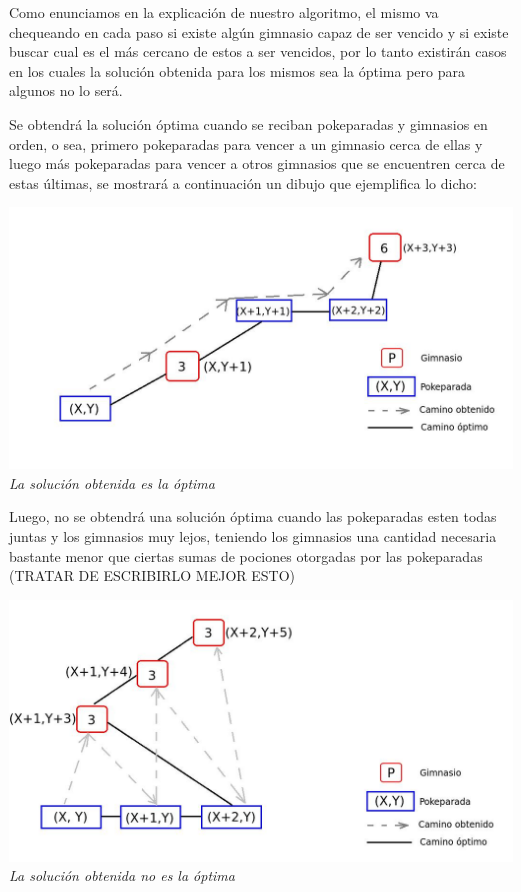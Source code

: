 Como enunciamos en la explicaci\'on de nuestro algoritmo, el mismo va chequeando en cada paso si existe alg\'un gimnasio capaz de ser vencido y si existe buscar cual es el m\'as cercano de estos a ser vencidos, por lo tanto existir\'an casos en los cuales la soluci\'on obtenida para los mismos sea la \'optima pero para algunos no lo ser\'a.

Se obtendr\'a la soluci\'on \'optima cuando se reciban pokeparadas y gimnasios en orden, o sea, primero pokeparadas para vencer a un gimnasio cerca de ellas y luego m\'as pokeparadas para vencer a otros gimnasios que se encuentren cerca de estas \'ultimas, se mostrar\'a a continuaci\'on un dibujo que ejemplifica lo dicho:

\vspace*{0.3cm} \vspace*{0.3cm}
  \begin{center}
\includegraphics[scale=0.60]{./EJ2/optima.jpeg}
\\{\textit{La soluci\'on obtenida es la \'optima}}
  \end{center}
  \vspace*{0.3cm}

Luego, no se obtendr\'a una soluci\'on \'optima cuando las pokeparadas esten todas juntas y los gimnasios muy lejos, teniendo los gimnasios una cantidad necesaria bastante menor que ciertas sumas de pociones otorgadas por las pokeparadas (TRATAR DE ESCRIBIRLO MEJOR ESTO)

\vspace*{0.3cm} \vspace*{0.3cm}
  \begin{center}
\includegraphics[scale=0.60]{./EJ2/nooptima.jpeg}
\\{\textit{La soluci\'on obtenida no es la \'optima}}
  \end{center}
  \vspace*{0.3cm}
  
